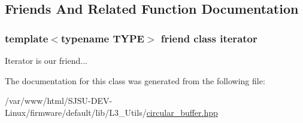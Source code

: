 \subsection{Friends And Related Function Documentation}
\subsubsection[{\texorpdfstring{iterator}{iterator}}]{\setlength{\rightskip}{0pt plus 5cm}template$<$typename T\+Y\+PE$>$ friend class {\bf iterator}\hspace{0.3cm}{\ttfamily [friend]}}\hypertarget{classCircularBuffer_a67171474c4da6cc8efe0c7fafefd2b2d}{}\label{classCircularBuffer_a67171474c4da6cc8efe0c7fafefd2b2d}


Iterator is our friend... 



The documentation for this class was generated from the following file\+:\begin{DoxyCompactItemize}
\item 
/var/www/html/\+S\+J\+S\+U-\/\+D\+E\+V-\/\+Linux/firmware/default/lib/\+L3\+\_\+\+Utils/\hyperlink{circular__buffer_8hpp}{circular\+\_\+buffer.\+hpp}\end{DoxyCompactItemize}
